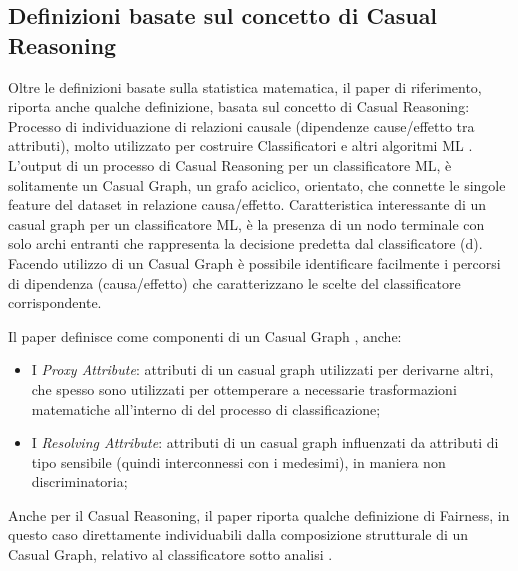  \subsection{Definizioni basate sul concetto di Casual Reasoning}
 Oltre le definizioni basate sulla statistica matematica, il paper di riferimento, riporta anche qualche definizione, basata sul concetto di Casual Reasoning: Processo di individuazione di relazioni causale (dipendenze cause/effetto tra attributi), molto utilizzato  per costruire Classificatori e altri algoritmi ML  \cite{FairnessDefinitionExplained}. L'output di un processo di Casual Reasoning per un classificatore ML, è solitamente un Casual Graph, un grafo aciclico, orientato, che connette le singole feature del dataset in relazione causa/effetto. Caratteristica interessante di un casual graph per un classificatore ML, è la presenza di un nodo terminale con solo archi entranti che rappresenta la decisione predetta dal classificatore (d). Facendo utilizzo di un Casual Graph è possibile identificare facilmente i percorsi di dipendenza (causa/effetto) che caratterizzano le scelte del classificatore corrispondente.
 
 Il paper definisce come componenti di un Casual Graph \cite{FairnessDefinitionExplained}, anche:
 \begin{itemize}
     \item I \emph{Proxy Attribute}: attributi di un casual graph utilizzati per derivarne altri, che spesso sono utilizzati per ottemperare a necessarie trasformazioni matematiche all'interno di del processo di classificazione;
     \item I \emph{Resolving Attribute}: attributi di un casual graph influenzati da  attributi di tipo sensibile (quindi interconnessi con i medesimi), in maniera non discriminatoria;
 \end{itemize}
 
 Anche per il Casual Reasoning, il paper riporta qualche definizione di Fairness, in questo caso direttamente individuabili dalla composizione strutturale di un Casual Graph, relativo al classificatore sotto analisi \cite{FairnessDefinitionExplained}.
 
